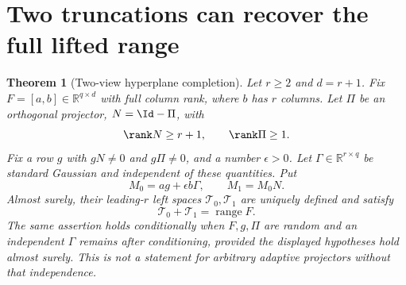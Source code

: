 \documentclass[11pt,oneside,openany,a4paper]{book}
\numberwithin{equation}{chapter}
\newtheorem{theorem}{Theorem}[chapter]
\theoremstyle{definition}
\theoremstyle{remark}
\newcommand{\R}{\mathbb R}\newcommand{\E}{\mathbb E}\newcommand{\Prb}{\mathbb P}\newcommand{\PP}{\mathbb P}
\DeclareMathOperator{\ran}{range}\DeclareMathOperator{\OPT}{OPT}
\begin{document}
\section{Two truncations can recover the full lifted range}
\begin{theorem}[Two-view hyperplane completion]\label{tangent:thm:twoview}
Let $r\ge2$ and $d=r+1$. Fix $F=[a,b]\in\R^{q\times d}$ with full column rank, where $b$ has $r$ columns. Let $\Pi$ be an orthogonal projector, $N=\Id-\Pi$, with
\[
 \rank N\ge r+1,\qquad \rank\Pi\ge1.
\]
Fix a row $g$ with $gN\ne0$ and $g\Pi\ne0$, and a number $\epsilon>0$. Let $\Gamma\in\R^{r\times q}$ be standard Gaussian and independent of these quantities. Put
\[
 M_0=ag+\epsilon b\Gamma,\qquad M_1=M_0N.
\]
Almost surely, their leading-$r$ left spaces $\mathscr T_0,\mathscr T_1$ are uniquely defined and satisfy
\begin{equation}\label{tangent:eq:span}
 \boxed{\mathscr T_0+\mathscr T_1=\ran F.}
\end{equation}
The same assertion holds conditionally when $F,g,\Pi$ are random and an independent $\Gamma$ remains after conditioning, provided the displayed hypotheses hold almost surely. This is not a statement for arbitrary adaptive projectors without that independence.
\end{theorem}
\end{document}

